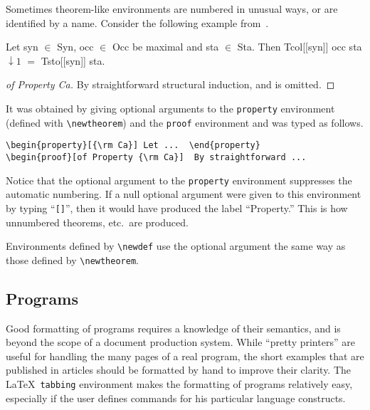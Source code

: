 Sometimes theorem-like environments are numbered in unusual ways, or
are identified by a name.  Consider the following example
from~\cite{7(3):359}.
\begin{property}[{\rm Ca}]
Let syn $\in$ Syn, occ $\in$ Occ be maximal and sta $\in$ Sta.  Then
Tcol\/{\rm [[}syn\/{\rm ]]} occ sta\hspace{-2pt} $\downarrow\!1$ $=$
Tsto\/{\rm [[}syn\/{\rm ]]} sta.
\end{property}
\begin{proof}[of Property {\rm Ca}]
By straightforward structural induction, and is \linebreak
omitted.
\end{proof}
It was obtained by giving optional arguments to the
{\tt property} environment (defined with \verb|\newtheorem|)
and the {\tt proof} environment and was typed as follows.
\begin{verbatim}
\begin{property}[{\rm Ca}] Let ...  \end{property}
\begin{proof}[of Property {\rm Ca}]  By straightforward ...
\end{verbatim}
Notice that the optional argument to the {\tt property} environment
suppresses the automatic numbering.  If a null optional argument
were given to this environment by typing ``{\tt []}'', then
it would have produced the label ``{\sc Property.}''  This is
how unnumbered theorems, etc.\ are produced.

Environments defined by \verb|\newdef| use the optional
argument the same way as those defined by \verb|\newtheorem|.

\subsection{Programs}

Good formatting of programs requires a knowledge of their semantics,
and is beyond the scope of a document production system.  While
``pretty printers'' are useful for handling the many pages of a real
program, the short examples that are published in articles should be
formatted by hand to improve their clarity.  The \LaTeX\ {\tt tabbing}
environment makes the formatting of programs relatively easy,
especially if the user defines commands for his particular language
constructs.

